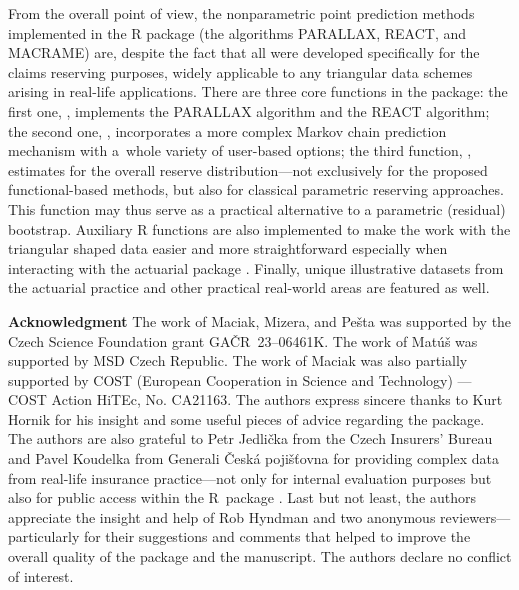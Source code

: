 From the overall point of view, the nonparametric point prediction methods implemented in the R package  (the algorithms PARALLAX, REACT, and MACRAME) are, despite the fact that all were developed specifically for the claims reserving purposes, widely applicable to any triangular data schemes arising in real-life applications. There are three core functions in the package: the first one, , implements the PARALLAX algorithm and the REACT algorithm; the second one, , incorporates a more complex Markov chain prediction mechanism with a~whole variety of user-based options; the third function, , estimates for the overall reserve distribution---not exclusively for the proposed functional-based methods, but also for classical parametric reserving approaches. This function may thus serve as a practical alternative to a parametric (residual) bootstrap. Auxiliary R functions are also implemented to make the work with the  triangular shaped data easier and more straightforward especially when interacting with the actuarial package . Finally, unique illustrative datasets from the actuarial practice and other practical real-world areas are featured as well.  

\newpage

\noindent \textbf{Acknowledgment}
\footnotesize
The work of Maciak, Mizera, and Pe\v{s}ta was supported by the Czech Science Foundation grant  GAČR~23--06461K. The work of Matúš was supported by MSD Czech Republic.  The work of Maciak was also partially
supported by COST (European
Cooperation in Science and Technology)
— COST Action HiTEc, No. CA21163. 
The authors express sincere thanks to Kurt Hornik for his insight and some useful pieces of advice regarding the  package. The authors are also grateful to Petr Jedlička from the Czech Insurers’ Bureau and Pavel Koudelka from Generali Česká pojišť\hspace{-0.04cm}ovna for providing complex data from real-life insurance practice---not only for internal evaluation purposes but also for public access within the R~package . Last but not least, the authors appreciate the insight and help of Rob Hyndman and two anonymous reviewers---particularly for their suggestions and comments that helped to improve the overall quality of the package and the manuscript. The authors declare no conflict of interest.

\setlength{\bibsep}{2.8pt}

